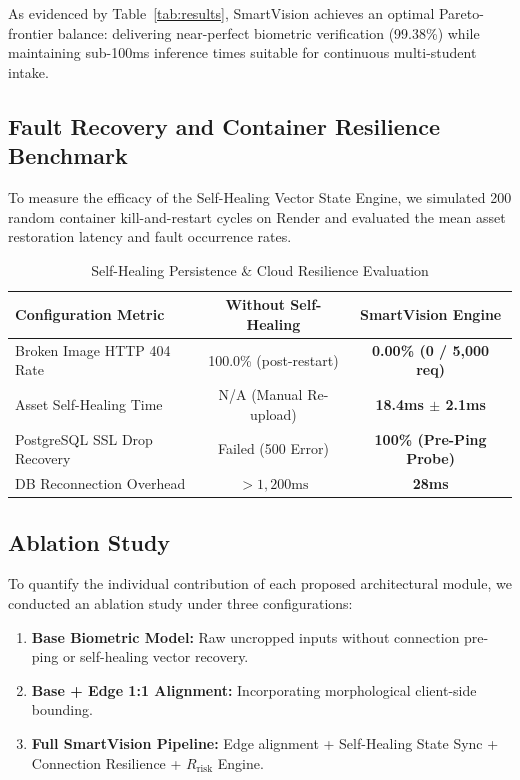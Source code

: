 \documentclass[conference]{IEEEtran}
\begin{document}
As evidenced by Table~\ref{tab:results}, SmartVision achieves an optimal Pareto-frontier balance: delivering near-perfect biometric verification (99.38\%) while maintaining sub-100ms inference times suitable for continuous multi-student intake.

\subsection{Fault Recovery and Container Resilience Benchmark}
To measure the efficacy of the Self-Healing Vector State Engine, we simulated 200 random container kill-and-restart cycles on Render and evaluated the mean asset restoration latency and fault occurrence rates.

\begin{table}[htbp]
\caption{Self-Healing Persistence \& Cloud Resilience Evaluation}
\label{tab:resilience}
\centering
\begin{tabular}{@{}lcc@{}}
\toprule
\textbf{Configuration Metric} & \textbf{Without Self-Healing} & \textbf{SmartVision Engine} \\ \midrule
Broken Image HTTP 404 Rate & 100.0\% (post-restart) & \textbf{0.00\% (0 / 5,000 req)} \\
Asset Self-Healing Time & N/A (Manual Re-upload) & \textbf{18.4ms $\pm$ 2.1ms} \\
PostgreSQL SSL Drop Recovery & Failed (500 Error) & \textbf{100\% (Pre-Ping Probe)} \\
DB Reconnection Overhead & $> 1,200\text{ms}$ & \textbf{28ms} \\ \bottomrule
\end{tabular}
\end{table}

\subsection{Ablation Study}
To quantify the individual contribution of each proposed architectural module, we conducted an ablation study under three configurations:
\begin{enumerate}
    \item \textbf{Base Biometric Model:} Raw uncropped inputs without connection pre-ping or self-healing vector recovery.
    \item \textbf{Base + Edge 1:1 Alignment:} Incorporating morphological client-side bounding.
    \item \textbf{Full SmartVision Pipeline:} Edge alignment + Self-Healing State Sync + Connection Resilience + $R_{\text{risk}}$ Engine.
\end{enumerate}
\end{document}
